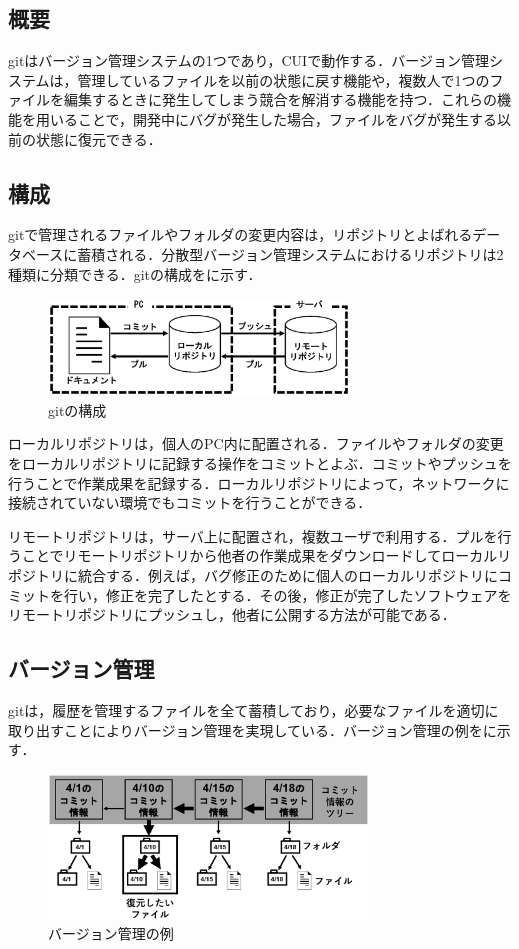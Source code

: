 \documentclass[a4j,9pt,twocolumn]{jsarticle}
\begin{document}
\subsection{概要}
gitはバージョン管理システムの1つであり，CUIで動作する．バージョン管理システムは，管理しているファイルを以前の状態に戻す機能や，複数人で1つのファイルを編集するときに発生してしまう競合を解消する機能を持つ．これらの機能を用いることで，開発中にバグが発生した場合，ファイルをバグが発生する以前の状態に復元できる\cite{pop}．

\subsection{構成}
gitで管理されるファイルやフォルダの変更内容は，リポジトリとよばれるデータベースに蓄積される．分散型バージョン管理システムにおけるリポジトリは2種類に分類できる．gitの構成をに示す．

\begin{figure}[h]
\centering
\includegraphics[width=80mm]{img/git.eps}
\caption{gitの構成}
\label{git}
\end{figure}

ローカルリポジトリは，個人のPC内に配置される．ファイルやフォルダの変更をローカルリポジトリに記録する操作をコミットとよぶ．コミットやプッシュを行うことで作業成果を記録する．ローカルリポジトリによって，ネットワークに接続されていない環境でもコミットを行うことができる．

リモートリポジトリは，サーバ上に配置され，複数ユーザで利用する．プルを行うことでリモートリポジトリから他者の作業成果をダウンロードしてローカルリポジトリに統合する．例えば，バグ修正のために個人のローカルリポジトリにコミットを行い，修正を完了したとする．その後，修正が完了したソフトウェアをリモートリポジトリにプッシュし，他者に公開する方法が可能である．

\subsection{バージョン管理}
gitは，履歴を管理するファイルを全て蓄積しており，必要なファイルを適切に取り出すことによりバージョン管理を実現している．バージョン管理の例をに示す．

\begin{figure}[h]
\centering
\includegraphics[width=85mm]{img/tree.eps}
\caption{バージョン管理の例}
\label{tree}
\end{figure}
\end{document}
